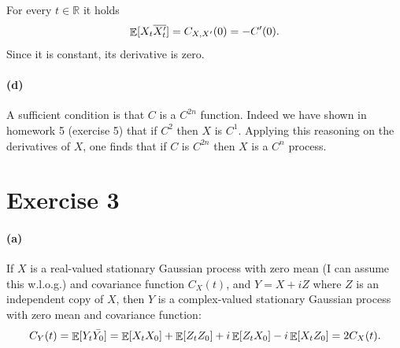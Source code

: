 \documentclass[a4paper,11pt]{article}
\theoremstyle{definition}
\theoremstyle{plain}
\theoremstyle{remark}
\DeclarePairedDelimiter{\parq}{[}{]}
\DeclareMathOperator*{\expval}{\mathbb{E}}
\begin{document}
For every $t\in\mathbb{R}$ it holds
$$
\expval\parq{X_{t}\overline{X_t'}} = C_{X,X'}(0) = -C'(0).
$$
Since it is constant, its derivative is zero.

\paragraph*{(d)}

A sufficient condition is that $C$ is a $C^{2n}$ function. Indeed we have shown in homework 5 (exercise 5) that if $C^2$ then $X$ is $C^1$. Applying this reasoning on the derivatives of $X$, one finds that if $C$ is $C^{2n}$ then $X$ is a $C^n$ process. 
 
\section*{Exercise 3}

\paragraph*{(a)} If $X$ is a real-valued stationary Gaussian process with zero mean (I can assume this w.l.o.g.) and covariance function $C_X(t)$, and $Y = X + iZ$ where $Z$ is an independent copy of $X$, then $Y$ is a complex-valued stationary Gaussian process with zero mean and covariance function:
$$
C_Y(t) = \expval\parq{Y_t\bar{Y_0}} = \expval\parq{X_tX_0} + \expval\parq{Z_tZ_0} + i\expval\parq{Z_tX_0} - i\expval\parq{X_tZ_0} = 2C_X(t).
$$
 
\end{document}
